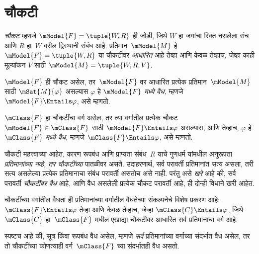 \section{चौकटी}\label{nml:frd:fra:sec}

\begin{defn}
  \emph{चौकट} म्हणजे $\mModel{F} = \tuple{W,R}$ ही जोडी, जिथे
  $W$ हा जगांचा रिक्त नसलेला संच आणि $R$ हा~$W$ वरील
  द्विस्थानी संबंध आहे. प्रतिमान~$\mModel{M}$ हे
  $\mModel{F} = \tuple{W,R}$ या चौकटीवर \emph{आधारित}
  आहे तेव्हा आणि केवळ तेव्हाच, जेव्हा काही मूल्यांकन
  $V$ साठी $\mModel{M} = \tuple{W, R, V}$.
\end{defn}

\begin{defn}
  $\mModel{F}$ ही चौकट असेल, तर~$\mModel{F}$ वर आधारित
  प्रत्येक प्रतिमान~$\mModel{M}$ साठी $\mSat{M}{\varphi}$
  असल्यास $\varphi$ हे \emph{$\mModel{F}$ मध्ये वैध,}
  म्हणजे $\mModel{F} \Entails \varphi$, असे म्हणतो.

  $\mClass{F}$ हा चौकटींचा वर्ग असेल, तर त्या वर्गातील
  प्रत्येक चौकट~$\mModel{F} \in \mClass{F}$ साठी
  $\mModel{F} \Entails \varphi$ असल्यास, आणि तेव्हाच,
  $\varphi$ हे \emph{$\mClass{F}$ मध्ये वैध,}
  म्हणजे $\mClass{F} \Entails \varphi$, असे म्हणतो.
\end{defn}

चौकटी महत्त्वाच्या आहेत, कारण रूपबंध आणि प्राप्यता
संबंध~$R$ याचे गुणधर्म यांमधील अनुरूपता \emph{प्रतिमानांच्या
नव्हे, तर चौकटींच्या} पातळीवर असते. उदाहरणार्थ,
 सर्व परावर्ती प्रतिमानांत सत्य असला,
तरी  सत्य असलेल्या प्रत्येक प्रतिमानाचा संबंध
परावर्ती असतोच असे नाही. परंतु असे \emph{खरे} आहे की,
 सर्व परावर्ती \emph{चौकटींवर} \emph{वैध} आहे,
आणि  वैध
असलेली प्रत्येक चौकट परावर्ती आहे, ही दोन्ही विधाने
खरी आहेत.

\begin{rem}
चौकटींच्या वर्गातील वैधता ही प्रतिमानांच्या वर्गातील
वैधतेच्या संकल्पनेचे विशेष प्रकरण आहे: $\mClass{F} \Entails \varphi$
तेव्हा आणि केवळ तेव्हाच, जेव्हा $\mClass{C} \Entails \varphi$,
जिथे $\mClass{C}$ हा~$\mClass{F}$ मधील एखाद्या
चौकटीवर आधारित सर्व प्रतिमानांचा वर्ग आहे.

स्पष्टच आहे की, सूत्र किंवा रूपबंध वैध असेल,
म्हणजे \emph{सर्व} प्रतिमानांच्या वर्गाच्या संदर्भात वैध
असेल, तर तो चौकटींच्या कोणत्याही वर्ग~$\mClass{F}$
च्या संदर्भातही वैध असतो.
\end{rem}













